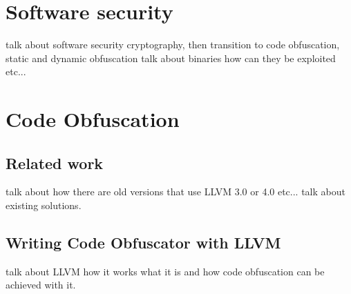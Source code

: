 \section{Software security}

talk about software security cryptography, then transition to code obfuscation, static and dynamic obfuscation
talk about binaries how can they be exploited etc...

\section{Code Obfuscation}
\subsection{Related work}
talk about how there are old versions that use LLVM 3.0 or 4.0 etc...
talk about existing solutions.
\subsection{Writing Code Obfuscator with LLVM}
talk about LLVM how it works what it is and how code obfuscation can be achieved with it.

